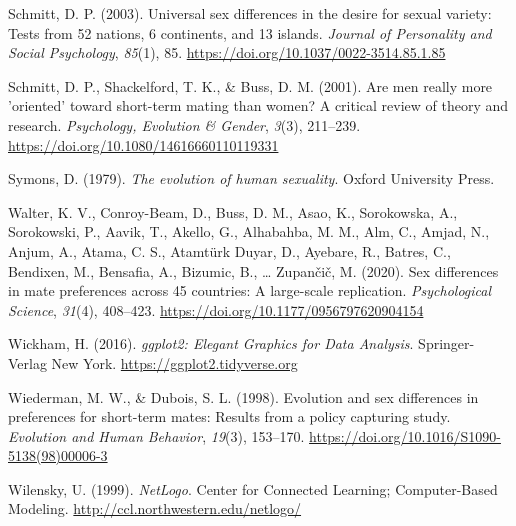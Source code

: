 \documentclass[
  12pt,
]{article}
\newlength{\cslhangindent}
\newlength{\cslentryspacingunit} %
\newenvironment{CSLReferences}[2] %
 {%
  \setlength{\parindent}{0pt}
  \ifodd #1
  \let\oldpar\par
  \def\par{\hangindent=\cslhangindent\oldpar}
  \fi
  \setlength{\parskip}{#2\cslentryspacingunit}
 }%
 {}
\begin{document}
\begin{CSLReferences}{1}{0}
\leavevmode{}%
Schmitt, D. P. (2003). Universal sex differences in the desire for
sexual variety: Tests from 52 nations, 6 continents, and 13 islands.
\emph{Journal of Personality and Social Psychology}, \emph{85}(1), 85.
\url{https://doi.org/10.1037/0022-3514.85.1.85}

\leavevmode{}%
Schmitt, D. P., Shackelford, T. K., \& Buss, D. M. (2001). Are men
really more 'oriented' toward short-term mating than women? A critical
review of theory and research. \emph{Psychology, Evolution \& Gender},
\emph{3}(3), 211--239. \url{https://doi.org/10.1080/14616660110119331}

\leavevmode{}%
Symons, D. (1979). \emph{The evolution of human sexuality}. Oxford
University Press.

\leavevmode{}%
Walter, K. V., Conroy-Beam, D., Buss, D. M., Asao, K., Sorokowska, A.,
Sorokowski, P., Aavik, T., Akello, G., Alhabahba, M. M., Alm, C., Amjad,
N., Anjum, A., Atama, C. S., Atamtürk Duyar, D., Ayebare, R., Batres,
C., Bendixen, M., Bensafia, A., Bizumic, B., \ldots{} Zupančič, M.
(2020). Sex differences in mate preferences across 45 countries: A
large-scale replication. \emph{Psychological Science}, \emph{31}(4),
408--423. \url{https://doi.org/10.1177/0956797620904154}

\leavevmode{}%
Wickham, H. (2016). \emph{{ggplot2: Elegant Graphics for Data
Analysis}}. Springer-Verlag New York.
\url{https://ggplot2.tidyverse.org}

\leavevmode{}%
Wiederman, M. W., \& Dubois, S. L. (1998). Evolution and sex differences
in preferences for short-term mates: Results from a policy capturing
study. \emph{Evolution and Human Behavior}, \emph{19}(3), 153--170.
\url{https://doi.org/10.1016/S1090-5138(98)00006-3}

\leavevmode{}%
Wilensky, U. (1999). \emph{NetLogo}. Center for Connected Learning;
Computer-Based Modeling. \url{http://ccl.northwestern.edu/netlogo/}

\end{CSLReferences}

\newpage
\end{document}
